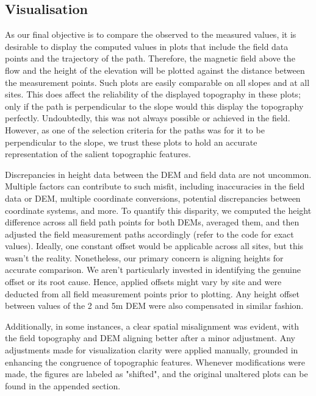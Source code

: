 \subsection{Visualisation}
As our final objective is to compare the observed to the measured values, it is desirable to display the computed values in plots that include the field data points and the trajectory of the path. Therefore, the magnetic field above the flow and the height of the elevation will be plotted against the distance between the measurement points. Such plots are easily comparable on all slopes and at all sites. This does affect the reliability of the displayed topography in these plots; only if the path is perpendicular to the slope would this display the topography perfectly. Undoubtedly, this was not always possible or achieved in the field. However, as one of the selection criteria for the paths was for it to be perpendicular to the slope, we trust these plots to hold an accurate representation of the salient topographic features.  \par
Discrepancies in height data between the DEM and field data are not uncommon. Multiple factors can contribute to such misfit, including inaccuracies in the field data or DEM, multiple coordinate conversions, potential discrepancies between coordinate systems, and more. To quantify this disparity, we computed the height difference across all field path points for both DEMs, averaged them, and then adjusted the field measurement paths accordingly (refer to the code for exact values). Ideally, one constant offset would be applicable across all sites, but this wasn't the reality. Nonetheless, our primary concern is aligning heights for accurate comparison. We aren't particularly invested in identifying the genuine offset or its root cause. Hence, applied offsets might vary by site and were deducted from all field measurement points prior to plotting. Any height offset between values of the 2 and 5m DEM were also compensated in similar fashion. \par
Additionally, in some instances, a clear spatial misalignment was evident, with the field topography and DEM aligning better after a minor adjustment. Any adjustments made for visualization clarity were applied manually, grounded in enhancing the congruence of topographic features. Whenever modifications were made, the figures are labeled as "shifted", and the original unaltered plots can be found in the appended section.
